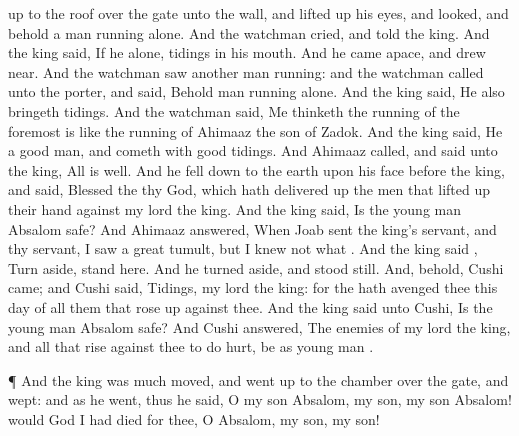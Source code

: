 {up to the
roof over the
gate unto the
wall, and lifted
up his
eyes, and
looked, and behold a
man
running alone.
And the
watchman
cried, and
told the
king. And the
king
said, If he
{} alone,
{}
tidings in his
mouth. And he
came
apace, and drew
near.
And the
watchman
saw
another
man
running: and the
watchman
called unto the
porter, and
said, Behold
{}
man
running alone. And the
king
said, He also bringeth
tidings.
And the
watchman
said, Me
thinketh the
running of the
foremost is like the
running of
Ahimaaz the
son of
Zadok. And the
king
said, He
{} a
good
man, and
cometh with
good
tidings.
And
Ahimaaz
called, and
said unto the
king, All is
well. And he fell
down to the
earth upon his
face before the
king, and
said,
Blessed
{} the
{} thy
God, which hath delivered
up the
men that lifted
up their
hand against my
lord the
king.
And the
king
said, Is the young
man
Absalom
safe? And
Ahimaaz
answered, When
Joab
sent the
king’s
servant, and
{} thy
servant, I
saw a
great
tumult, but I
knew not what
{}.
And the
king
said
{}, Turn
aside,
{}
stand
here. And he turned
aside, and stood
still.
And, behold,
Cushi
came; and
Cushi
said,
Tidings, my
lord the
king: for the
{} hath
avenged thee this
day of all
them that rose
up against thee.
And the
king
said unto
Cushi, Is the young
man
Absalom
safe? And
Cushi
answered, The
enemies of my
lord the
king, and all that
rise against thee to do
{}
hurt, be as
{} young
man
{}.
\par }{\PP {}¶ And the
king was much
moved, and went
up to the
chamber over the
gate, and
wept: and as he
went, thus he
said, O my
son
Absalom, my
son, my
son
Absalom! would God I had
died for
thee, O
Absalom, my
son, my
son!

}
